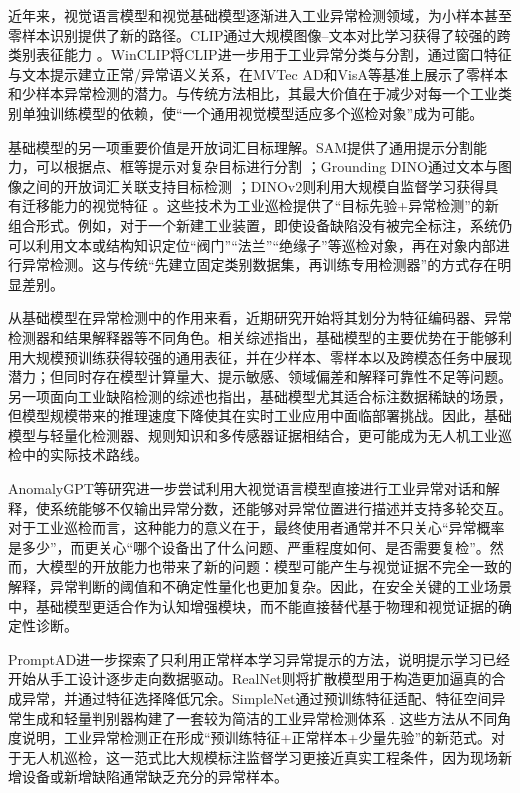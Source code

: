 近年来，视觉语言模型和视觉基础模型逐渐进入工业异常检测领域，为小样本甚至零样本识别提供了新的路径。CLIP通过大规模图像--文本对比学习获得了较强的跨类别表征能力
\cite{radford2021learning}。WinCLIP将CLIP进一步用于工业异常分类与分割，通过窗口特征与文本提示建立正常/异常语义关系，在MVTec AD和VisA等基准上展示了零样本和少样本异常检测的潜力。与传统方法相比，其最大价值在于减少对每一个工业类别单独训练模型的依赖，使“一个通用视觉模型适应多个巡检对象”成为可能。

基础模型的另一项重要价值是开放词汇目标理解。SAM提供了通用提示分割能力，可以根据点、框等提示对复杂目标进行分割
\cite{kirillov2023segment}；Grounding DINO通过文本与图像之间的开放词汇关联支持目标检测
\cite{liu2024grounding}；DINOv2则利用大规模自监督学习获得具有迁移能力的视觉特征
\cite{oquab2024dinov2}。这些技术为工业巡检提供了“目标先验+异常检测”的新组合形式。例如，对于一个新建工业装置，即使设备缺陷没有被完全标注，系统仍可以利用文本或结构知识定位“阀门”“法兰”“绝缘子”等巡检对象，再在对象内部进行异常检测。这与传统“先建立固定类别数据集，再训练专用检测器”的方式存在明显差别。

从基础模型在异常检测中的作用来看，近期研究开始将其划分为特征编码器、异常检测器和结果解释器等不同角色。相关综述指出，基础模型的主要优势在于能够利用大规模预训练获得较强的通用表征，并在少样本、零样本以及跨模态任务中展现潜力；但同时存在模型计算量大、提示敏感、领域偏差和解释可靠性不足等问题\cite{ren2025foundationAD}。另一项面向工业缺陷检测的综述也指出，基础模型尤其适合标注数据稀缺的场景，但模型规模带来的推理速度下降使其在实时工业应用中面临部署挑战\cite{yang2025foundationIAD}。因此，基础模型与轻量化检测器、规则知识和多传感器证据相结合，更可能成为无人机工业巡检中的实际技术路线。

AnomalyGPT等研究进一步尝试利用大视觉语言模型直接进行工业异常对话和解释，使系统能够不仅输出异常分数，还能够对异常位置进行描述并支持多轮交互\cite{gu2024anomalyGPT}。对于工业巡检而言，这种能力的意义在于，最终使用者通常并不只关心“异常概率是多少”，而更关心“哪个设备出了什么问题、严重程度如何、是否需要复检”。然而，大模型的开放能力也带来了新的问题：模型可能产生与视觉证据不完全一致的解释，异常判断的阈值和不确定性量化也更加复杂。因此，在安全关键的工业场景中，基础模型更适合作为认知增强模块，而不能直接替代基于物理和视觉证据的确定性诊断。

PromptAD进一步探索了只利用正常样本学习异常提示的方法，说明提示学习已经开始从手工设计逐步走向数据驱动\cite{promptad2024}。RealNet则将扩散模型用于构造更加逼真的合成异常，并通过特征选择降低冗余\cite{realnet2024}。SimpleNet通过预训练特征适配、特征空间异常生成和轻量判别器构建了一套较为简洁的工业异常检测体系
\cite{promptad2024,realnet2024,simpleNet2023}. 这些方法从不同角度说明，工业异常检测正在形成“预训练特征+正常样本+少量先验”的新范式\cite{simpleNet2023,realnet2024,promptad2024}。对于无人机巡检，这一范式比大规模标注监督学习更接近真实工程条件，因为现场新增设备或新增缺陷通常缺乏充分的异常样本。

